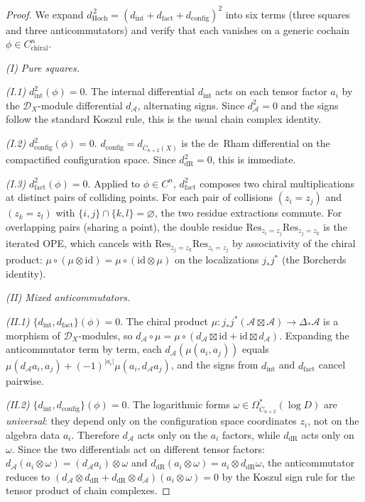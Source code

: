 \begin{proof}
We expand $d_{\mathrm{Hoch}}^{\,2}
= (d_{\text{int}} + d_{\text{fact}}
+ d_{\text{config}})^2$ into six terms (three squares and
three anticommutators) and verify that each vanishes on a
generic cochain $\phi \in C^n_{\text{chiral}}$.

\emph{(I) Pure squares.}

\emph{(I.1)} $d_{\text{int}}^2(\phi) = 0$.
The internal differential $d_{\text{int}}$ acts on each
tensor factor $a_i$ by the $\mathcal{D}_X$-module differential
$d_\mathcal{A}$, alternating signs.  Since $d_\mathcal{A}^2 = 0$
and the signs follow the standard Koszul rule, this is the
usual chain complex identity.

\emph{(I.2)} $d_{\text{config}}^2(\phi) = 0$.
$d_{\text{config}} = d_{\overline{C}_{n+2}(X)}$ is the
de~Rham differential on the compactified configuration space.
Since $d_{\mathrm{dR}}^2 = 0$, this is immediate.

\emph{(I.3)} $d_{\text{fact}}^2(\phi) = 0$.
Applied to $\phi \in C^n$, $d_{\text{fact}}^2$ composes two
chiral multiplications at distinct pairs of colliding points.
For each pair of collisions $(z_i = z_j)$ and $(z_k = z_l)$
with $\{i,j\} \cap \{k,l\} = \varnothing$, the two residue
extractions commute.  For overlapping pairs (sharing a point),
the double residue
$\mathrm{Res}_{z_i = z_j}\mathrm{Res}_{z_j = z_k}$ is the
iterated OPE, which cancels with
$\mathrm{Res}_{z_j = z_k}\mathrm{Res}_{z_i = z_j}$ by
associativity of the chiral product: $\mu \circ (\mu \otimes
\mathrm{id}) = \mu \circ (\mathrm{id} \otimes \mu)$ on the
localizations $j_*j^*$ (the Borcherds identity).

\emph{(II) Mixed anticommutators.}

\emph{(II.1)} $\{d_{\text{int}}, d_{\text{fact}}\}(\phi) = 0$.
The chiral product $\mu\colon j_*j^*(\mathcal{A} \boxtimes
\mathcal{A}) \to \Delta_*\mathcal{A}$ is a morphism of
$\mathcal{D}_X$-modules, so $d_\mathcal{A} \circ \mu =
\mu \circ (d_\mathcal{A} \boxtimes \mathrm{id} +
\mathrm{id} \boxtimes d_\mathcal{A})$.  Expanding the
anticommutator term by term, each
$d_\mathcal{A}(\mu(a_i, a_j))$ equals
$\mu(d_\mathcal{A} a_i, a_j) + (-1)^{|a_i|}
\mu(a_i, d_\mathcal{A} a_j)$,
and the signs from $d_{\text{int}}$ and $d_{\text{fact}}$
cancel pairwise.

\emph{(II.2)} $\{d_{\text{int}}, d_{\text{config}}\}(\phi) = 0$.
The logarithmic forms
$\omega \in \Omega^*_{\overline{C}_{n+2}}(\log D)$
are \emph{universal}: they depend only on the configuration
space coordinates $z_i$, not on the algebra data $a_i$.
Therefore $d_\mathcal{A}$ acts only on the $a_i$ factors,
while $d_{\mathrm{dR}}$ acts only on $\omega$.  Since the
two differentials act on different tensor factors:
$d_\mathcal{A}(a_i \otimes \omega) =
(d_\mathcal{A} a_i) \otimes \omega$ and
$d_{\mathrm{dR}}(a_i \otimes \omega) =
a_i \otimes d_{\mathrm{dR}}\omega$,
the anticommutator reduces to
$(d_\mathcal{A} \otimes d_{\mathrm{dR}} +
d_{\mathrm{dR}} \otimes d_\mathcal{A})(a_i \otimes \omega)
= 0$ by the Koszul sign rule for the tensor product of
chain complexes.


\end{proof}
